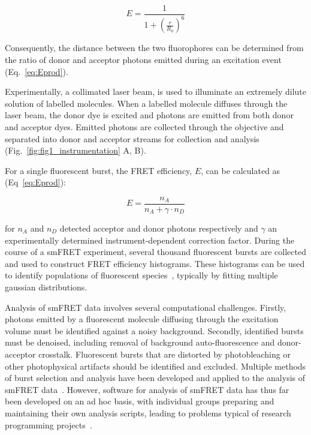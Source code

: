 \documentclass[10pt]{article}
\begin{document}
\begin{equation}
E = \frac{1}{1 + (\frac{r}{R_0})^6} 
\label{eq:efficiency}
\end{equation}

Consequently, the distance between the two fluorophores can be determined from the ratio of donor and acceptor photons emitted during an excitation event (Eq.~\ref{eq:Eprod}).

Experimentally, a collimated laser beam, is used to illuminate an extremely dilute solution of labelled molecules. When a labelled molecule diffuses through the laser beam, the donor dye is excited and photons are emitted from both donor and acceptor dyes.  Emitted photons are collected through the objective and separated into donor and acceptor streams for collection and analysis (Fig.~\ref{fig:fig1_instrumentation} A, B). 

For a single fluorescent burst, the FRET efficiency, $E$, can be calculated as (Eq~\ref{eq:Eprod}):

\begin{equation}
E = \frac{n_A}{n_A + \gamma \cdot n_D}
\label{eq:Eprod}
\end{equation} 

for $n_A$ and $n_D$ detected acceptor and donor photons respectively and $\gamma$ an experimentally determined instrument-dependent correction factor. During the course of a smFRET experiment, several thousand fluorescent bursts are collected and used to construct FRET efficiency histograms. These histograms can be used to identify populations of fluorescent species~\cite{ha96}, typically by fitting multiple gaussian distributions.

Analysis of smFRET data involves several computational challenges. Firstly, photons emitted by a fluorescent molecule diffusing through the excitation volume must be identified against a noisy background. Secondly, identified bursts must be denoised, including removal of background auto-fluorescence and donor-acceptor crosstalk. Fluorescent bursts that are distorted by photobleaching or other photophysical artifacts should be identified and excluded. Multiple methods of burst selection and analysis have been developed and applied to the analysis of smFRET data~\cite{weiss00, deniz01, gell06, nir06, kapanidis05, muller05, doose07, kudryavtsev2012, eggeling01}. However, software for analysis of smFRET data has thus far been developed on an ad hoc basis, with individual groups preparing and maintaining their own analysis scripts, leading to problems typical of research programming projects~\cite{wilson06, merali10}. 
\end{document}
